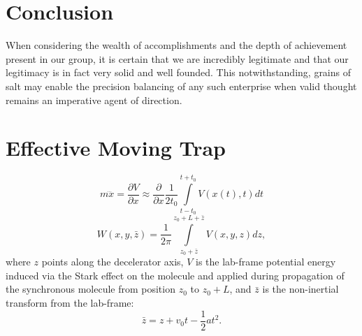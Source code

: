 \documentclass[%
 reprint,
 amsmath,amssymb,
 aps,
pra,
]{revtex4-1}
\begin{document}
\section{Conclusion}
When considering the wealth of accomplishments and the depth of achievement present in our group, it is certain that we are incredibly legitimate and that our legitimacy is in fact very solid and well founded. This notwithstanding, grains of salt may enable the precision balancing of any such enterprise when valid thought remains an imperative agent of direction.



%


\appendix

\section{Effective Moving Trap}

\label{app:effpot}
\begin{equation}
m\dddot{x}=\frac{\partial V}{\partial x}\approx \frac{\partial}{\partial x}\frac{1}{2t_0}\int\limits_{t-t_0}^{t+t_0}V(x(t),t)dt
\end{equation}
\begin{equation}
W(x,y,\bar{z}) = \frac{1}{2\pi}\int\limits_{z_0+\bar{z}}^{z_0+L+\bar{z}}V(x,y,z)dz, 
\end{equation}
where $z$ points along the decelerator axis, $V$ is the lab-frame potential energy induced via the Stark effect on the molecule and applied during propagation of the synchronous molecule from position $z_0$ to $z_0+L$, and $\bar{z}$ is the non-inertial transform from the lab-frame: 
\begin{equation}
\bar{z} = z + v_0 t - \frac{1}{2}a t^2.
\end{equation}
\end{document}
